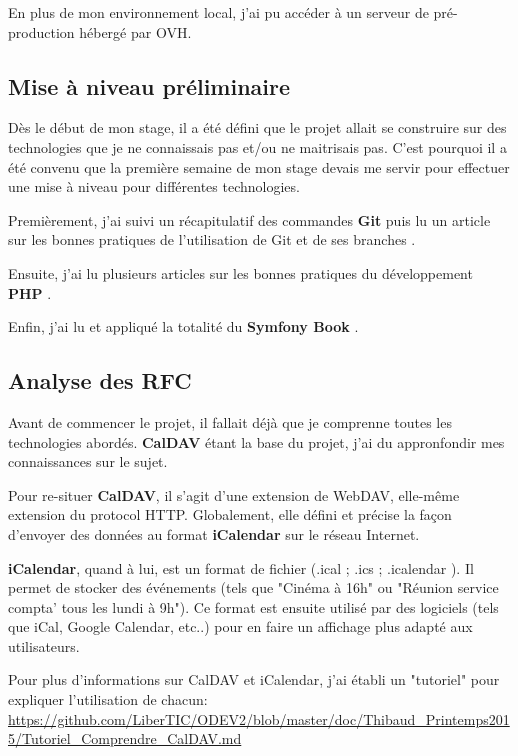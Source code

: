 En plus de mon environnement local, j'ai pu accéder à un serveur de pré-production hébergé par OVH.

\subsection{Mise à niveau préliminaire}

Dès le début de mon stage, il a été défini que le projet allait se construire sur des technologies que je ne connaissais pas et/ou ne maitrisais pas. C'est pourquoi il a été convenu que la première semaine de mon stage devais me servir pour effectuer une mise à niveau pour différentes technologies.

Premièrement, j'ai suivi un récapitulatif des commandes \textbf{Git} \cite{gitimmersion} puis lu un article sur les bonnes pratiques de l'utilisation de Git et de ses branches \cite{successfulgit}.

Ensuite, j'ai lu plusieurs articles sur les bonnes pratiques du développement \textbf{PHP} \cite{bestpracticephp} \cite{stupidvssolid}.

Enfin, j'ai lu et appliqué la totalité du \textbf{Symfony Book} \cite{symfonybook}.

\subsection{Analyse des RFC}

Avant de commencer le projet, il fallait déjà que je comprenne toutes les technologies abordés. \textbf{CalDAV} étant la base du projet, j'ai du appronfondir mes connaissances sur le sujet.

Pour re-situer \textbf{CalDAV}, il s'agit d'une extension de WebDAV, elle-même extension du protocol HTTP. Globalement, elle défini et précise la façon d'envoyer des données au format \textbf{iCalendar} sur le réseau Internet.

\textbf{iCalendar}, quand à lui, est un format de fichier (.ical ; .ics ; .icalendar ). Il permet de stocker des événements (tels que "Cinéma à 16h" ou "Réunion service compta' tous les lundi à 9h"). Ce format est ensuite utilisé par des logiciels (tels que iCal, Google Calendar, etc..) pour en faire un affichage plus adapté aux utilisateurs.

Pour plus d'informations sur CalDAV et iCalendar, j'ai établi un "tutoriel" pour expliquer l'utilisation de chacun: \url{https://github.com/LiberTIC/ODEV2/blob/master/doc/Thibaud_Printemps2015/Tutoriel_Comprendre_CalDAV.md}

